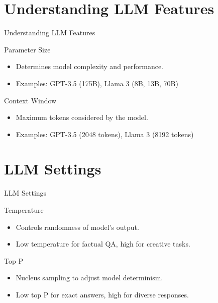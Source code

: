\documentclass[aspectratio=169]{beamer}
\begin{document}
\section{Understanding LLM Features}

\begin{frame}{Understanding LLM Features}
  \begin{block}{Parameter Size}
    \begin{itemize}
      \item Determines model complexity and performance.
      \item Examples: GPT-3.5 (175B), Llama 3 (8B, 13B, 70B)
    \end{itemize}
  \end{block}

  \begin{block}{Context Window}
    \begin{itemize}
      \item Maximum tokens considered by the model.
      \item Examples: GPT-3.5 (2048 tokens), Llama 3 (8192 tokens)
    \end{itemize}
  \end{block}
\end{frame}

\section{LLM Settings}

\begin{frame}{LLM Settings}
  \begin{block}{Temperature}
    \begin{itemize}
      \item Controls randomness of model's output.
      \item Low temperature for factual QA, high for creative tasks.
    \end{itemize}
  \end{block}

  \begin{block}{Top P}
    \begin{itemize}
      \item Nucleus sampling to adjust model determinism.
      \item Low top P for exact answers, high for diverse responses.
    \end{itemize}
  \end{block}
\end{frame}
\end{document}
